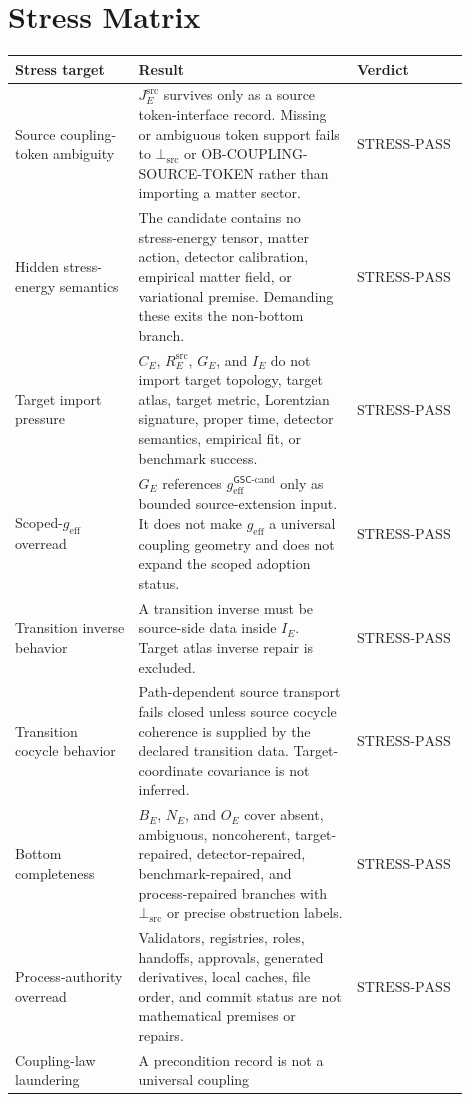 \documentclass[11pt]{article}
\newcommand{\geff}{g_{\mathrm{eff}}}
\newcommand{\geffCand}{g_{\mathrm{eff}}^{\mathsf{GSC}\mbox{-}\mathrm{cand}}}
\newcommand{\BottomSrc}{\bot_{\mathrm{src}}}
\newcommand{\OBCoupling}{\mathrm{OB}\mbox{-}\mathrm{COUPLING}}
\newcommand{\StressPass}{\mathrm{STRESS}\mbox{-}\mathrm{PASS}}
\begin{document}
\section{Stress Matrix}

\begin{longtable}{p{0.26\linewidth}p{0.46\linewidth}p{0.18\linewidth}}
\toprule
Stress target & Result & Verdict \\
\midrule
Source coupling-token ambiguity & \(J^{\mathrm{src}}_E\) survives only as a
source token-interface record. Missing or ambiguous token support fails to
\(\BottomSrc\) or \(\OBCoupling\)-SOURCE-TOKEN rather than importing a matter
sector. & \(\StressPass\) \\
Hidden stress-energy semantics & The candidate contains no stress-energy
tensor, matter action, detector calibration, empirical matter field, or
variational premise. Demanding these exits the non-bottom branch. &
\(\StressPass\) \\
Target import pressure & \(C_E\), \(R^{\mathrm{src}}_E\), \(G_E\), and
\(I_E\) do not import target topology, target atlas, target metric,
Lorentzian signature, proper time, detector semantics, empirical fit, or
benchmark success. & \(\StressPass\) \\
Scoped-\(\geff\) overread & \(G_E\) references \(\geffCand\) only as bounded
source-extension input. It does not make \(\geff\) a universal coupling
geometry and does not expand the scoped adoption status. & \(\StressPass\) \\
Transition inverse behavior & A transition inverse must be source-side data
inside \(I_E\). Target atlas inverse repair is excluded. & \(\StressPass\) \\
Transition cocycle behavior & Path-dependent source transport fails closed
unless source cocycle coherence is supplied by the declared transition data.
Target-coordinate covariance is not inferred. & \(\StressPass\) \\
Bottom completeness & \(B_E\), \(N_E\), and \(O_E\) cover absent, ambiguous,
noncoherent, target-repaired, detector-repaired, benchmark-repaired, and
process-repaired branches with \(\BottomSrc\) or precise obstruction labels.
& \(\StressPass\) \\
Process-authority overread & Validators, registries, roles, handoffs,
approvals, generated derivatives, local caches, file order, and commit status
are not mathematical premises or repairs. & \(\StressPass\) \\
Coupling-law laundering & A precondition record is not a universal coupling

\end{longtable}
\end{document}
